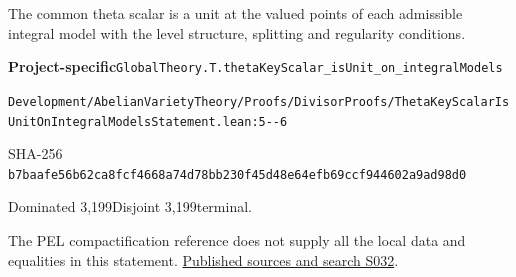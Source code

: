 
\begin{formalstatement}[D128]\label{decomp:D128}
The common theta scalar is a unit at the valued points of each admissible integral model with the level structure, splitting and regularity conditions.
\end{formalstatement}
{\small\raggedright\noindent\textsf{\bfseries Project-specific}\quad \nolinkurl{GlobalTheory.T.thetaKeyScalar_isUnit_on_integralModels}\par\noindent \nolinkurl{Development/AbelianVarietyTheory/Proofs/DivisorProofs/ThetaKeyScalarIsUnitOnIntegralModelsStatement.lean:5--6}\par\noindent SHA-256 \nolinkurl{b7baafe56b62ca8fcf4668a74d78bb230f45d48e64efb69ccf944602a9ad98d0}\par\noindent Dominated 3,199\quad Disjoint 3,199\quad terminal.\par}
The PEL compactification reference does not supply all the local data and equalities in this statement.
\hyperref[lit:S032]{Published sources and search S032}.
